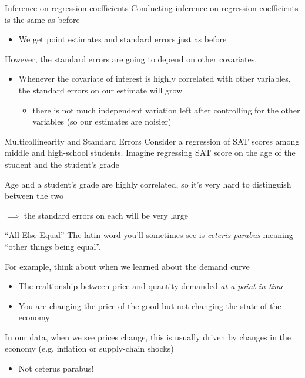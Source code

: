\documentclass[aspectratio=169,t,11pt,table]{beamer}
\begin{document}
\begin{frame}{Inference on regression coefficients}
  Conducting inference on regression coefficients is the same as before
  \begin{itemize}
    \item We get point estimates and standard errors just as before
  \end{itemize}

  \pause
  \bigskip
  However, the standard errors are going to depend on other covariates. 

  \begin{itemize}
    \item Whenever the covariate of interest is highly correlated with other variables, the standard errors on our estimate will grow
    
    \begin{itemize}
      \item there is not much independent variation left after controlling for the other variables (so our estimates are noisier)
    \end{itemize}
  \end{itemize}
\end{frame}

\begin{frame}{Multicollinearity and Standard Errors}
  Consider a regression of SAT scores among middle and high-school students. Imagine regressing SAT score on the age of the student and the student's grade

  \bigskip
  Age and a student's grade are highly correlated, so it's very hard to distinguish between the two 
  
  $\implies$ the standard errors on each will be very large
\end{frame}

\begin{frame}{``All Else Equal''}
  The latin word you'll sometimes see is \emph{ceteris parabus} meaning ``other things being equal''.
  
  \bigskip
  For example, think about when we learned about the demand curve
  \begin{itemize}
    \item The realtionship between price and quantity demanded \emph{at a point in time}
    
    \item You are changing the price of the good but not changing the state of the economy
  \end{itemize}

  \pause
  \bigskip
  In our data, when we see prices change, this is usually driven by changes in the economy (e.g. inflation or supply-chain shocks)
  \begin{itemize}
    \item Not ceterus parabus!
  \end{itemize}
\end{frame}
\end{document}
